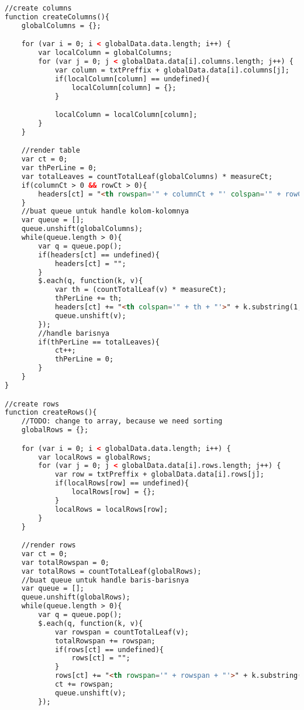 \begin{lstlisting}[language=HTML,basicstyle=\tiny,caption=script.js]
//create columns
function createColumns(){
    globalColumns = {};

    for (var i = 0; i < globalData.data.length; i++) {
        var localColumn = globalColumns;
        for (var j = 0; j < globalData.data[i].columns.length; j++) {
            var column = txtPreffix + globalData.data[i].columns[j];
            if(localColumn[column] == undefined){
                localColumn[column] = {};
            }

            localColumn = localColumn[column];
        }
    }

    //render table
    var ct = 0;
    var thPerLine = 0;
    var totalLeaves = countTotalLeaf(globalColumns) * measureCt;
    if(columnCt > 0 && rowCt > 0){
        headers[ct] = "<th rowspan='" + columnCt + "' colspan='" + rowCt + "'></th>";
    }
    //buat queue untuk handle kolom-kolomnya
    var queue = [];
    queue.unshift(globalColumns);
    while(queue.length > 0){
        var q = queue.pop();
        if(headers[ct] == undefined){
            headers[ct] = "";
        }
        $.each(q, function(k, v){
            var th = (countTotalLeaf(v) * measureCt);
            thPerLine += th;
            headers[ct] += "<th colspan='" + th + "'>" + k.substring(1, k.length) + "</th>";
            queue.unshift(v);
        });
        //handle barisnya
        if(thPerLine == totalLeaves){
            ct++;
            thPerLine = 0;
        }
    }
}

//create rows
function createRows(){
    //TODO: change to array, because we need sorting
    globalRows = {};

    for (var i = 0; i < globalData.data.length; i++) {
        var localRows = globalRows;
        for (var j = 0; j < globalData.data[i].rows.length; j++) {
            var row = txtPreffix + globalData.data[i].rows[j];
            if(localRows[row] == undefined){
                localRows[row] = {};
            }
            localRows = localRows[row];
        }
    }

    //render rows
    var ct = 0;
    var totalRowspan = 0;
    var totalRows = countTotalLeaf(globalRows);
    //buat queue untuk handle baris-barisnya
    var queue = [];
    queue.unshift(globalRows);
    while(queue.length > 0){
        var q = queue.pop();
        $.each(q, function(k, v){
            var rowspan = countTotalLeaf(v);
            totalRowspan += rowspan;
            if(rows[ct] == undefined){
                rows[ct] = "";
            }
            rows[ct] += "<th rowspan='" + rowspan + "'>" + k.substring(1, k.length) + "</th>";
            ct += rowspan;
            queue.unshift(v);
        });


\end{lstlisting}
